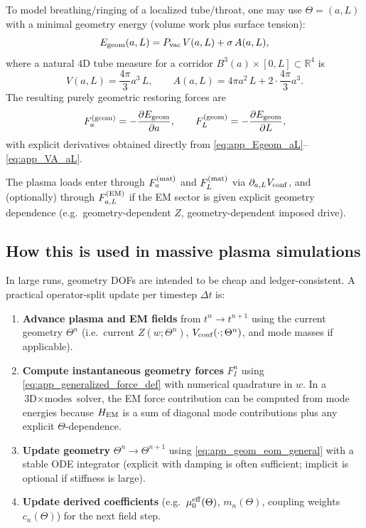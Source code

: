 \documentclass[11pt]{article}
\begin{document}
To model breathing/ringing of a localized tube/throat, one may use \(\Theta=(a,L)\) with a minimal
geometry energy (volume work plus surface tension):
\begin{equation}
E_{\rm geom}(a,L) = P_{\rm vac}\,V(a,L) + \sigma\,A(a,L),
\label{eq:app_Egeom_aL}
\end{equation}
where a natural \(4\)D tube measure for a corridor \(B^3(a)\times[0,L]\subset\mathbb{R}^4\) is
\begin{equation}
V(a,L)=\frac{4\pi}{3}a^3\,L,
\qquad
A(a,L)=4\pi a^2\,L + 2\cdot\frac{4\pi}{3}a^3.
\label{eq:app_VA_aL}
\end{equation}
The resulting purely geometric restoring forces are
\begin{equation}
F_a^{({\rm geom})}=-\frac{\partial E_{\rm geom}}{\partial a},
\qquad
F_L^{({\rm geom})}=-\frac{\partial E_{\rm geom}}{\partial L},
\end{equation}
with explicit derivatives obtained directly from \eqref{eq:app_Egeom_aL}--\eqref{eq:app_VA_aL}.

The plasma loads enter through \(F_a^{({\rm mat})}\) and \(F_L^{({\rm mat})}\) via
\(\partial_{a,L}V_{\rm conf}\), and (optionally) through \(F_{a,L}^{({\rm EM})}\) if the EM sector is
given explicit geometry dependence (e.g.\ geometry-dependent \(Z\), geometry-dependent imposed drive).

\subsection{How this is used in massive plasma simulations}
\label{app:geom_in_hpc}

In large runs, geometry DOFs are intended to be cheap and ledger-consistent. A practical operator-split
update per timestep \(\Delta t\) is:

\begin{enumerate}[leftmargin=1.7em]
\item \textbf{Advance plasma and EM fields} from \(t^n\to t^{n+1}\) using the current geometry \(\Theta^n\)
(i.e.\ current \(Z(w;\Theta^n)\), \(V_{\rm conf}(\cdot;\Theta^n)\), and mode masses if applicable).

\item \textbf{Compute instantaneous geometry forces} \(F_I^n\) using \eqref{eq:app_generalized_force_def} with
numerical quadrature in \(w\). In a \(\text{3D}\times\text{modes}\) solver, the EM force contribution can be
computed from mode energies because \(H_{\rm EM}\) is a sum of diagonal mode contributions plus any explicit
\(\Theta\)-dependence.

\item \textbf{Update geometry} \(\Theta^n\to \Theta^{n+1}\) using \eqref{eq:app_geom_eom_general} with a stable ODE
integrator (explicit with damping is often sufficient; implicit is optional if stiffness is large).

\item \textbf{Update derived coefficients} (e.g.\ \(\mu_0^{\rm eff}(\Theta)\), \(m_n(\Theta)\), coupling weights \(c_n(\Theta)\))
for the next field step.
\end{enumerate}
\end{document}
